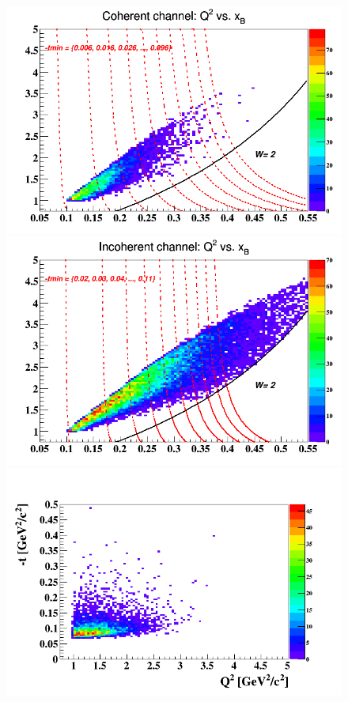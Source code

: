 \begin{figure}[h!]
\includegraphics[scale=0.35]{fig_dvcs/coh_Q2_xB.png}
\includegraphics[scale=0.35]{fig_dvcs/incoh_Q2_xB.png}
\includegraphics[scale=0.35]{fig_dvcs/new_t_Q2_Coh.png}

\end{figure}
